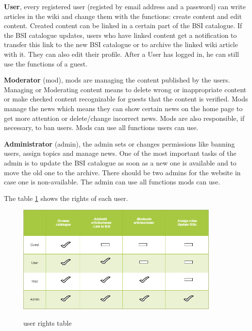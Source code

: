 \textbf{User}, every registered user (registed by email address and a password) can write articles in the wiki and change them with the functions: create content and edit content. 
Created content can be linked in a certain part of the BSI catalogue. 
If the BSI catalogue updates, users who have linked content get a notification to transfer this link to the new BSI catalogue or to archive the linked wiki article with it.
They can also edit their profile. 
After a User has logged in, he can still use the functions of a guest.
\bigskip

\textbf{Moderator} (mod), mods are managing the content published by the users.
Managing or Moderating content means to delete wrong or inappropriate content or make checked content recognizable for guests that the content is verified.  
Mods manage the news which means they can show certain news on the home page to get more attention or delete/change incorrect news. 
Mods are also responsible, if necessary, to ban users. 
Mods can use all functions users can use.
\bigskip

\textbf{Administrator} (admin), the admin sets or changes permissions like banning users, assign topics and manage news.
One of the most important tasks of the admin is to update the BSI catalogue as soon as a new one is available and to move the old one to the archive.  There should be two admins for the website in case one is non-available.
The admin can use all functions mods can use. 
\bigskip

The table \ref{fig:usertypes} shows the rights of each user.

\begin{figure}[h]
    \centering
    \includegraphics[width=0.9\textwidth]{Pictures/user_types}
    \label{fig:usertypes}
    \caption{user rights table}
\end{figure}

